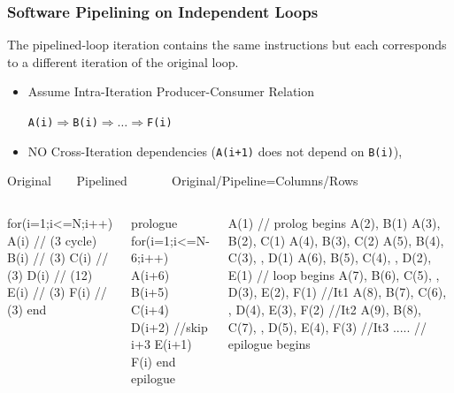 \documentclass{beamer}
\renewcommand{\emph}[1]{\textcolor{structure}{#1}}
\newcommand{\emp}[1]{\textcolor{DikuRed}{ #1}}
\begin{document}
\begin{frame}[fragile,t]
    \frametitle{Software Pipelining on Independent Loops}

The pipelined-loop iteration contains the same instructions 
but each corresponds to a different iteration of the original loop.

\begin{scriptsize}
\begin{itemize}
\item Assume Intra-Iteration Producer-Consumer Relation 
\begin{scriptsize}{\tt A(i)$\Rightarrow$B(i)$\Rightarrow\ldots \Rightarrow$F(i)}\end{scriptsize}
\item NO Cross-Iteration dependencies ({\tt A(i+1)} does not depend on {\tt B(i)}),
\end{itemize}
\end{scriptsize}


\begin{block}{Original{\tt~~~~}Pipelined{\tt~~~~~~~}Original/Pipeline=Columns/Rows}\vspace{-2ex}
\begin{columns}
\begin{colorcode}[fontsize=\tiny]
for(i=1;i<=N;i++)
  A(i) // (3 cycle)
  B(i) // (3)
  C(i) // (3)
  D(i) // (12)
  E(i) // (3)
  F(i) // (3)
end
\end{colorcode}
\begin{colorcode}[fontsize=\tiny]
prologue
for(i=1;i<=N-6;i++)
  A(i+6)
  B(i+5)
  C(i+4)
  D(i+2) //\alert{skip i+3}
  E(i+1)
  F(i)
end
epilogue
\end{colorcode}
\pause
\begin{colorcode}[fontsize=\tiny]
\emp{A(1)}                                      // \emp{prolog begins}
\emp{A(2), B(1)} 
\emp{A(3), B(2), C(1)} 
\emp{A(4), B(3), C(2)} 
\emp{A(5), B(4), C(3),     , D(1)}
\emp{A(6), B(5), C(4),     , D(2), E(1)} // \emph{loop begins}
\emph{A(7), B(6), C(5),     , D(3), E(2), F(1)   //It1}
\emph{A(8), B(7), C(6),     , D(4), E(3), F(2)   //It2}
\emph{A(9), B(8), C(7),     , D(5), E(4), F(3)   //It3}
\emp{.....                                     // epilogue begins} 
\end{colorcode}
\end{columns}
\end{block}
\smallskip



\end{frame}
\end{document}
